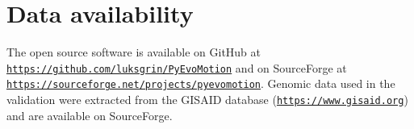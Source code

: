 \section*{Data availability}
The open source software is available on GitHub at \href{https://github.com/luksgrin/PyEvoMotion}{\texttt{https://github.com/luksgrin/PyEvoMotion}} and on SourceForge at \href{https://sourceforge.net/projects/pyevomotion}{\texttt{https://sourceforge.net/projects/pyevomotion}}. Genomic data used in the validation were extracted from the GISAID database (\href{https://www.gisaid.org}{\texttt{https://www.gisaid.org}}) and are available on SourceForge.

\vfill

\pagebreak


